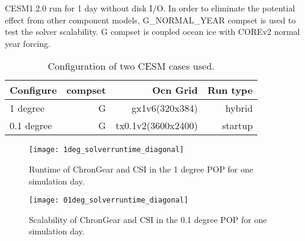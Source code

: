 \documentclass{sig-alternate}
\begin{document}
CESM1.2.0 run for 1 day without disk I/O. In order to eliminate the potential effect from other component models, G\_NORMAL\_YEAR compset is used to test the solver scalability. G compset is coupled ocean ice with COREv2 normal year forcing.  

\begin{table}
\centering
\caption{Configuration of two CESM cases  used. \label{tab:caseinfo}}
\begin{tabular}{|l|r|r|r|}
\hline
Configure&  compset  & Ocn Grid &  Run type\\\hline
1 degree & G &gx1v6(320x384) & hybrid \\\hline
0.1 degree  &  G &tx0.1v2(3600x2400)  &startup \\\hline
\end{tabular}
\end{table}
\begin {figure}
\centering
\texttt{[image: 1deg\_solverruntime\_diagonal]}
\caption []{Runtime of ChronGear and CSI in the 1 degree POP for one simulation day. \label {fig:scale1}}
\end {figure}

\begin {figure}
\centering
\texttt{[image: 01deg\_solverruntime\_diagonal]}
\caption []{Scalability of ChronGear and CSI in the 0.1 degree POP for one simulation day.\label {fig:scale01}}
\end {figure}

\end{document}
